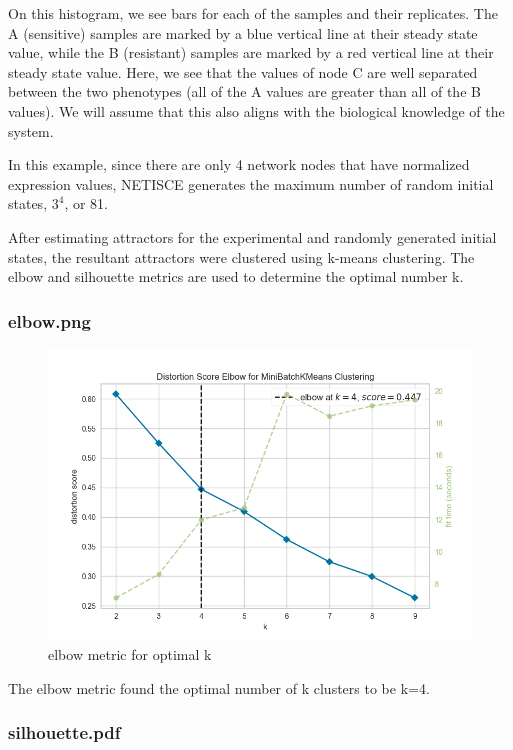 \documentclass[
]{book}
\begin{document}
On this histogram, we see bars for each of the samples and their replicates. The A (sensitive) samples are marked by a blue vertical line at their steady state value, while the B (resistant) samples are marked by a red vertical line at their steady state value. Here, we see that the values of node C are well separated between the two phenotypes (all of the A values are greater than all of the B values). We will assume that this also aligns with the biological knowledge of the system.

In this example, since there are only 4 network nodes that have normalized expression values, NETISCE generates the maximum number of random initial states, \(3^4\), or 81.

After estimating attractors for the experimental and randomly generated initial states, the resultant attractors were clustered using k-means clustering. The elbow and silhouette metrics are used to determine the optimal number k.

\hypertarget{section-id}{%
\subsubsection*{elbow.png}\label{section-id}}

\begin{figure}

{\centering \includegraphics[width=0.5\linewidth]{results/elbow} 

}

\caption{elbow metric for optimal k}\label{fig:unnamed-chunk-11}
\end{figure}

The elbow metric found the optimal number of k clusters to be k=4.

\hypertarget{section-id}{%
\subsubsection*{silhouette.pdf}\label{section-id}}
\end{document}
